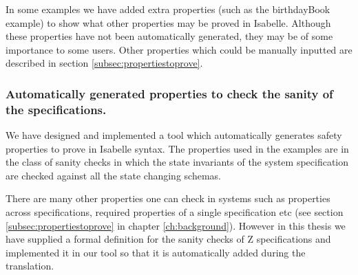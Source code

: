 In some examples we have added extra properties (such as the birthdayBook
example) to show what other properties may be proved in Isabelle. Although these
properties have not been automatically generated, they may be of some importance
to some users. Other properties which could be manually inputted are described
in section \ref{subsec:propertiestoprove}.

%

\subsubsection{Automatically generated properties to check the sanity of the specifications.}
We have designed and
implemented a tool which automatically generates safety properties to prove in
Isabelle syntax. The properties used in the examples are in the class of sanity
checks in which the state invariants of the system specification are checked
against all the state changing schemas.

There are many other properties one can check in systems such as properties
across specifications, required properties of a single specification etc (see
section \ref{subsec:propertiestoprove} in chapter \ref{ch:background}).
However in this thesis we have supplied a formal definition for the sanity
checks of Z specifications and implemented it in our tool so that it is
automatically added during the translation.


